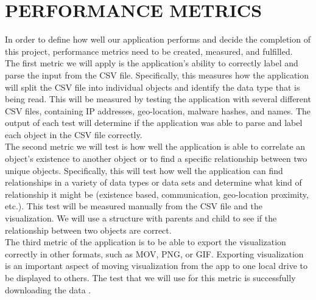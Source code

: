 \documentclass[journal,10pt,onecolumn,compsoc]{IEEEtran} \usepackage[margin=1.0in]{geometry} \usepackage{pdfpages}
\begin{document}
\section{PERFORMANCE METRICS}
In order to define how well our application performs and decide the completion of this project, performance metrics need to be created, measured, and fulfilled. \\
\newline
The first metric we will apply is the application's ability to correctly label and parse the input from the CSV file. Specifically, this measures how the application will split the CSV file into individual objects and identify the data type that is being read. This will be measured by testing the application with several different CSV files, containing IP addresses, geo-location, malware hashes, and names. The output of each test will determine if the application was able to parse and label each object in the CSV file correctly.\\
\newline
The second metric we will test is how well the application is able to correlate an object's existence to another object or to find a specific relationship between two unique objects. Specifically, this will test how well the application can find relationships in a variety of data types or data sets and determine what kind of relationship it might be (existence based, communication, geo-location proximity, etc.). This test will be measured manually from the CSV file and the visualization. We will use a structure with parents and child to see if the relationship between two objects are correct.\\
\newline
The third metric of the application is to be able to export the visualization correctly in other formats, such as MOV, PNG, or GIF. Exporting visualization is an important aspect of moving visualization from the app to one local drive to be displayed to others. The test that we will use for this metric is successfully downloading the data .
 
 \newpage  



\end{document}
